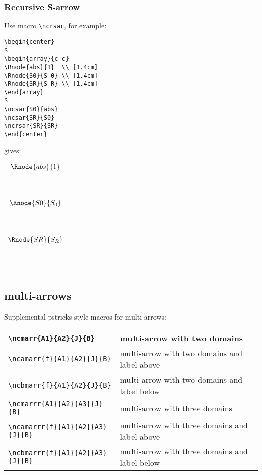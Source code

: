 \documentclass[10pt,a4paper]{article}
\begin{document}
\subsubsection {Recursive S-arrow}

\noindent
Use macro \verb'\ncrsar', for example:
\begin{verbatim}
\begin{center}
$
\begin{array}{c c}
\Rnode{abs}{1}  \\ [1.4cm]
\Rnode{S0}{S_0} \\ [1.4cm]
\Rnode{SR}{S_R} \\ [1.4cm]
\end{array}
$
\ncsar{S0}{abs}
\ncsar{SR}{S0}
\ncrsar{SR}{SR}
\end{center}
\end{verbatim}
gives:

\begin{center}
$
\begin{array}{c c}
\Rnode{abs}{1}  \\ [1.4cm]
\Rnode{S0}{S_0} \\ [1.4cm]
\Rnode{SR}{S_R} \\ [1.4cm]
\end{array}
$
\end{center}


\subsection {multi-arrows}

\noindent Supplemental pstricks style macros for multi-arrows:


		\begin{tabular}{|l |  p{5cm} | }
		   \hline
		   \verb!\ncmarr{A1}{A2}{J}{B}! & multi-arrow with two domains \\
		    \hline
		   \verb!\ncamarr{f}{A1}{A2}{J}{B}! & multi-arrow with two domains and label above \\
		   \hline
		 	 \verb!\ncbmarr{f}{A1}{A2}{J}{B}! & multi-arrow with two domains and label below \\
		 	 \hline
		 	 \verb!\ncmarrr{A1}{A2}{A3}{J}{B}! & multi-arrow with three domains \\
		 	 \hline
		   \verb!\ncamarrr{f}{A1}{A2}{A3}{J}{B}! & multi-arrow with three domains and label above \\
		   \hline
		 	 \verb!\ncbmarrr{f}{A1}{A2}{A3}{J}{B}! & multi-arrow with three domains and label below \\
		 	 \hline
		\end{tabular}
\end{document}
